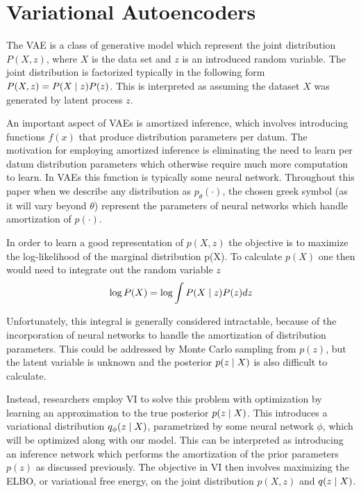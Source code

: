 \section{Variational Autoencoders}

The \ac{VAE} is a class of generative model which represent the joint distribution $P(X, z)$, where $X$ is the data set and $z$ is an introduced random variable. The joint distribution is factorized typically in the following form $P(X, z) = P(X\; | \;{z})P(z)$. This is interpreted as assuming the dataset $X$ was generated by latent process  $z$. 

An important aspect of \ac{VAE}s is amortized inference, which involves introducing functions $f(x)$ that produce distribution parameters per datum. The motivation for employing amortized inference is eliminating the need to learn per datum distribution parameters which otherwise require much more computation to learn. In \ac{VAE}s this function is typically some neural network. Throughout this paper when we describe any distribution as $p_{\theta}(\cdot)$, the chosen greek symbol (as it will vary beyond $\theta$) represent the parameters of neural networks which handle amortization of $p(\cdot)$. 

In order to learn a good representation of $p(X,z)$ the objective is to maximize the log-likelihood of the marginal distribution p(X). To calculate $p(X)$ one then would need to integrate out the random variable $z$
\begin{equation}
\log P(X) = \log \int P(X \; | \;{z}) P(z) dz
\end{equation}

Unfortunately, this integral is generally considered intractable, because of the incorporation of neural networks to handle the amortization of distribution parameters. This could be addressed by Monte Carlo sampling from $p(z)$, but the latent variable is unknown and the posterior $p(z \; | \;{X})$ is also difficult to calculate. 

Instead, researchers employ \ac{VI} to solve this problem with optimization by learning an approximation to the true posterior $p(z \; | \;{X})$. This introduces a variational distribution $q_{\phi}(z \; | \;{X})$, parametrized by some neural network $\phi$, which will be optimized along with our model. This can be interpreted as introducing an inference network which performs the amortization of the prior parameters $p(z)$ as discussed previously. The objective in \ac{VI} then involves maximizing the \ac{ELBO}, or variational free energy, on the joint distribution $p(X, z)$ and $q(z \; | \;{X})$. 

